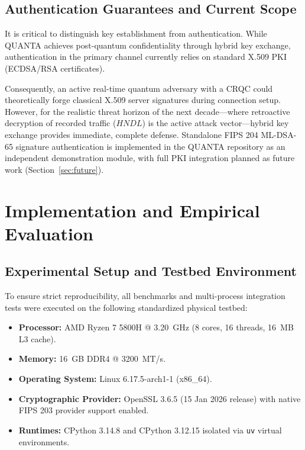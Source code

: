 \documentclass[conference]{IEEEtran}
\begin{document}
\subsection{Authentication Guarantees and Current Scope}
It is critical to distinguish key establishment from authentication. While QUANTA achieves post-quantum confidentiality through hybrid key exchange, authentication in the primary channel currently relies on standard X.509 PKI (ECDSA/RSA certificates).

Consequently, an active real-time quantum adversary with a CRQC could theoretically forge classical X.509 server signatures during connection setup. However, for the realistic threat horizon of the next decade—where retroactive decryption of recorded traffic ($HNDL$) is the active attack vector—hybrid key exchange provides immediate, complete defense. Standalone FIPS 204 ML-DSA-65 signature authentication is implemented in the QUANTA repository as an independent demonstration module, with full PKI integration planned as future work (Section~\ref{sec:future}).

\section{Implementation and Empirical Evaluation}

\subsection{Experimental Setup and Testbed Environment}
To ensure strict reproducibility, all benchmarks and multi-process integration tests were executed on the following standardized physical testbed:
\begin{itemize}
    \item \textbf{Processor:} AMD Ryzen 7 5800H @ 3.20~GHz (8 cores, 16 threads, 16~MB L3 cache).
    \item \textbf{Memory:} 16~GB DDR4 @ 3200~MT/s.
    \item \textbf{Operating System:} Linux 6.17.5-arch1-1 (x86\_64).
    \item \textbf{Cryptographic Provider:} OpenSSL 3.6.5 (15 Jan 2026 release) with native FIPS 203 provider support enabled.
    \item \textbf{Runtimes:} CPython 3.14.8 and CPython 3.12.15 isolated via \texttt{uv} virtual environments.
\end{itemize}
\end{document}
